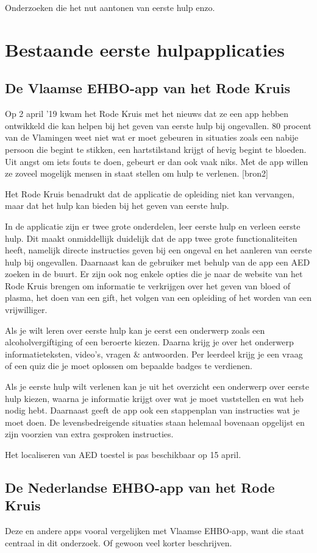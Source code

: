 Onderzoeken die het nut aantonen van eerste hulp enzo.

\section{Bestaande eerste hulpapplicaties}
\subsection{De Vlaamse EHBO-app van het Rode Kruis}
Op 2 april ’19 kwam het Rode Kruis met het nieuws dat ze een app hebben ontwikkeld die kan helpen bij het geven van eerste hulp bij ongevallen. 80 procent van de Vlamingen weet niet wat er moet gebeuren in situaties zoals een nabije persoon die begint te stikken, een hartstilstand krijgt of hevig begint te bloeden. Uit angst om iets fouts te doen, gebeurt er dan ook vaak niks. Met de app willen ze zoveel mogelijk mensen in staat stellen om hulp te verlenen. [bron2]

Het Rode Kruis benadrukt dat de applicatie de opleiding niet kan vervangen, maar dat het hulp kan bieden bij het geven van eerste hulp.

In de applicatie zijn er twee grote onderdelen, leer eerste hulp en verleen eerste hulp. Dit maakt onmiddellijk duidelijk dat de app twee grote functionaliteiten heeft, namelijk directe instructies geven bij een ongeval en het aanleren van eerste hulp bij ongevallen. Daarnaast kan de gebruiker met behulp van de app een AED zoeken in de buurt. Er zijn ook nog enkele opties die je naar de website van het Rode Kruis brengen om informatie te verkrijgen over het geven van bloed of plasma, het doen van een gift, het volgen van een opleiding of het worden van een vrijwilliger.

Als je wilt leren over eerste hulp kan je eerst een onderwerp zoals een alcoholvergiftiging of een beroerte kiezen. Daarna krijg je over het onderwerp informatieteksten, video’s, vragen \& antwoorden. Per leerdeel krijg je een vraag of een quiz die je moet oplossen om bepaalde badges te verdienen.

Als je eerste hulp wilt verlenen kan je uit het overzicht een onderwerp over eerste hulp kiezen, waarna je informatie krijgt over wat je moet vaststellen en wat heb nodig hebt. Daarnaast geeft de app ook een stappenplan van instructies wat je moet doen. De levensbedreigende situaties staan helemaal bovenaan opgelijst en zijn voorzien van extra gesproken instructies.

Het localiseren van AED toestel is pas beschikbaar op 15 april.

\subsection{De Nederlandse EHBO-app van het Rode Kruis}
Deze en andere apps vooral vergelijken met Vlaamse EHBO-app, want die staat centraal in dit onderzoek. Of gewoon veel korter beschrijven.
